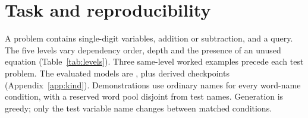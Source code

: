 \newsavebox{\appendixtablebox}

\section{Task and reproducibility}
\label{app:task}

\begin{table}[t]
\centering\small
{}
\caption{Matched names preserve the arithmetic. The misleading digit, 4, occurs nowhere else.}
\label{tab:conditions}
\end{table}
A problem contains single-digit variables, addition or subtraction, and a query. The five
levels vary dependency order, depth and the presence of an unused equation
(Table~\ref{tab:levels}). Three same-level worked examples precede each test problem.
The evaluated models are , plus  derived checkpoints
(Appendix~\ref{app:kind}). Demonstrations use ordinary names for every word-name
condition, with a reserved word pool disjoint from test names. Generation is greedy;
only the test variable name changes between matched conditions.

\begin{table}[t]
\centering\small\setlength{\tabcolsep}{4pt}
\caption{The five levels of \citet{kudo2026faithful}: additions or subtractions needed
(\emph{Steps}), variables unresolved when first read (\emph{Held}), and unused equations
(\emph{Distr.}). At level~1 the intermediate value is stated rather than computed.}
\label{tab:levels}
\end{table}

